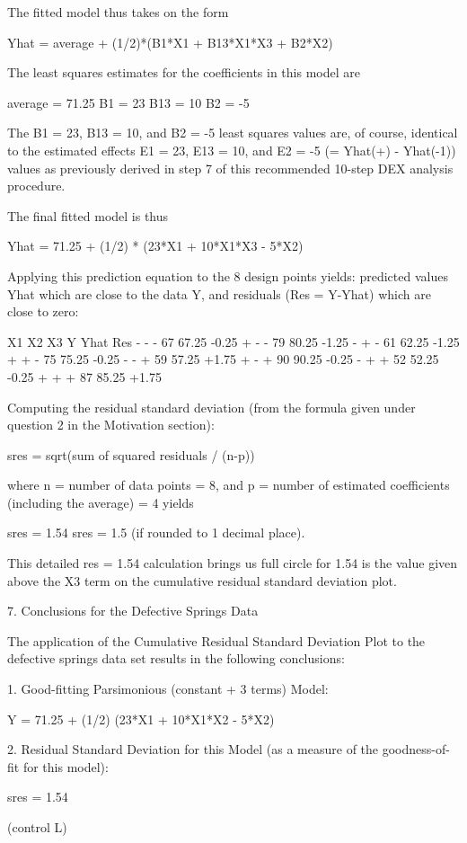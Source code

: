 The fitted model thus takes on the form

   Yhat = average + (1/2)*(B1*X1 + B13*X1*X3 + B2*X2)

The least squares estimates for the coefficients
in this model are

   average = 71.25
   B1 = 23
   B13 = 10
   B2 = -5

The B1 = 23, B13 = 10, and B2 = -5 least squares
values are, of course, identical to the estimated
effects E1 = 23, E13 = 10, and E2 = -5 (= Yhat(+)
- Yhat(-1)) values as previously derived in step 7
of this recommended 10-step DEX analysis
procedure.

The final fitted model is thus

   Yhat = 71.25 + (1/2) * (23*X1 + 10*X1*X3 - 5*X2)

Applying this prediction equation to the 8 design
points yields: predicted values Yhat which are
close to the data Y, and residuals (Res = Y-Yhat)
which are close to zero:

        X1     X2     X3       Y    Yhat     Res
         -      -      -      67    67.25   -0.25
         +      -      -      79    80.25   -1.25
         -      +      -      61    62.25   -1.25
         +      +      -      75    75.25   -0.25
         -      -      +      59    57.25   +1.75
         +      -      +      90    90.25   -0.25
         -      +      +      52    52.25   -0.25
         +      +      +      87    85.25   +1.75

Computing the residual standard deviation (from
the formula given under question 2 in the
Motivation section):

   sres = sqrt(sum of squared residuals / (n-p))

where n = number of data points = 8, and p =
number of estimated coefficients (including the
average) = 4 yields

   sres = 1.54
   sres = 1.5 (if rounded to 1 decimal place).

This detailed res = 1.54 calculation brings us full
circle for 1.54 is the value given above
the X3 term on the cumulative residual standard
deviation plot.

7. Conclusions for the Defective Springs Data

The application of the Cumulative Residual
Standard Deviation Plot to the defective springs
data set results in the following conclusions:

   1. Good-fitting Parsimonious (constant + 3
      terms) Model:

         Y = 71.25 + (1/2) (23*X1 + 10*X1*X2 - 5*X2)

   2. Residual Standard Deviation for this Model
      (as a measure of the goodness-of-fit for
      this model):

          sres = 1.54

(control L) 
